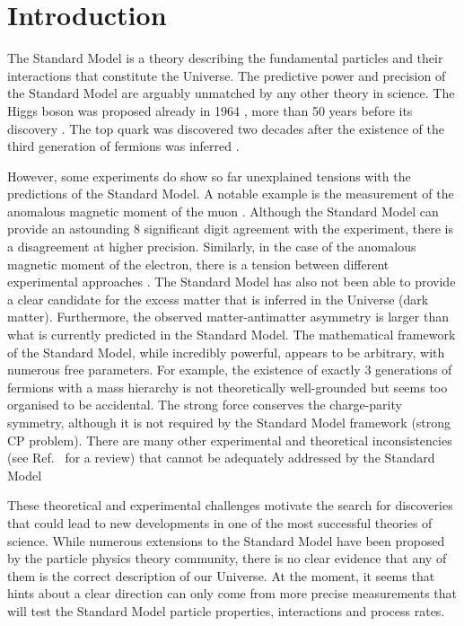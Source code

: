 \chapter{Introduction}\label{sec:introduction}

The Standard Model is a theory describing the fundamental particles and their interactions that constitute the Universe.
The predictive power and precision of the Standard Model are arguably unmatched by any other theory in science.
The Higgs boson was proposed already in 1964 \cite{PhysRevLett.13.508}, more than 50 years before its discovery \cite{ATLAS:2012yve,CMS:2012qbp}.
The top quark was discovered \cite{PhysRevLett.74.2632,PhysRevLett.74.2626} two decades after the existence of the third generation of fermions was inferred \cite{HARARI1975265}.

However, some experiments do show so far unexplained tensions with the predictions of the Standard Model. 
A notable example is the measurement of the anomalous magnetic moment of the muon \cite{PhysRevLett.126.141801}.
Although the Standard Model can provide an astounding 8 significant digit agreement with the experiment, there is a disagreement at higher precision.
Similarly, in the case of the anomalous magnetic moment of the electron, there is a tension between different experimental approaches \cite{PhysRevLett.100.120801,Morel:2020dww,Li:2021koa}.
The Standard Model has also not been able to provide a clear candidate for the excess matter that is inferred in the Universe (dark matter).
Furthermore, the observed matter-antimatter asymmetry 
is larger than what is currently predicted in the Standard Model.
The mathematical framework of the Standard Model, while incredibly powerful, appears to be arbitrary, with numerous free parameters.
For example, the existence of exactly 3 generations of fermions with a mass hierarchy is not theoretically well-grounded but seems too organised to be accidental.
The strong force conserves the charge-parity symmetry, although it is not required by the Standard Model framework (strong CP problem).
There are many other experimental and theoretical inconsistencies (see Ref.~\cite{Ellis:2002wba} for a review) that cannot be adequately addressed by the Standard Model

These theoretical and experimental challenges motivate the search for discoveries that could lead to new developments in one of the most successful theories of science.
While numerous extensions to the Standard Model have been proposed by the particle physics theory community, there is no clear evidence that any of them is the correct description of our Universe.
At the moment, it seems that hints about a clear direction can only come from more precise measurements that will test the Standard Model particle properties, interactions and process rates.

